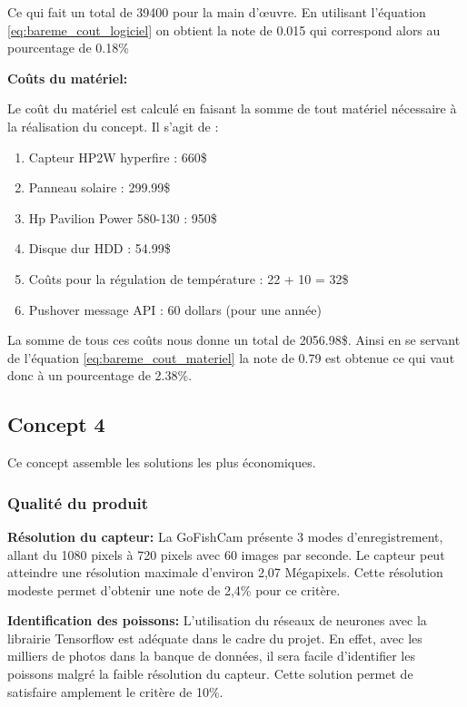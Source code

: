 Ce qui fait un total de 39400 pour la main d’œuvre. En utilisant l’équation \ref{eq:bareme_cout_logiciel} on obtient la note de 0.015 qui correspond alors au pourcentage de 0.18\%
\vspace{5mm}

\textbf{Coûts du matériel:}

Le coût du matériel est calculé en faisant la somme de tout matériel nécessaire à la réalisation du concept. Il s’agit de :
\begin{enumerate}
    \item Capteur HP2W hyperfire : 660\$
    \item Panneau solaire : 299.99\$
    \item Hp Pavilion Power 580-130 : 950\$
    \item Disque dur HDD : 54.99\$
    \item Coûts pour la régulation de température : 22 + 10 = 32\$
    \item Pushover message API : 60 dollars (pour une année)
\end{enumerate}

La somme de tous ces coûts nous donne un total de 2056.98\$. Ainsi en se servant de l’équation \ref{eq:bareme_cout_materiel} la note de 0.79 est obtenue ce qui vaut donc à un pourcentage de 2.38\%.


\subsection{Concept 4}

Ce concept assemble les solutions les plus économiques.

\subsubsection{Qualité du produit}

\textbf{Résolution du capteur:} La GoFishCam présente 3 modes d'enregistrement, allant du 1080 pixels à 720 pixels avec 60 images par seconde. Le capteur peut atteindre une résolution maximale d'environ 2,07 Mégapixels. Cette résolution modeste permet d'obtenir une note de 2,4\% pour ce critère. \vspace{5mm}

\textbf{Identification des poissons:} L'utilisation du réseaux de neurones avec la librairie Tensorflow est adéquate dans le cadre du projet. En effet, avec les milliers de photos dans la banque de données, il sera facile d'identifier les poissons malgré la faible résolution du capteur. Cette solution permet de satisfaire amplement le critère de 10\%. \vspace{5mm}

